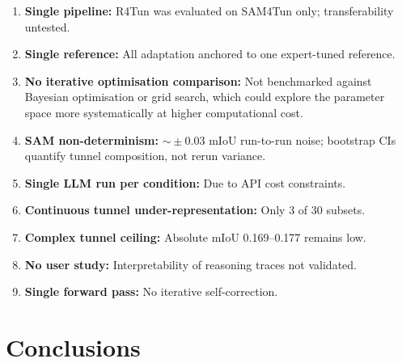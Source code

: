 \documentclass[a4paper,fleqn]{cas-dc}
\begin{document}
\begin{enumerate}
\item \textbf{Single pipeline:} R4Tun was evaluated on SAM4Tun only; transferability untested.
\item \textbf{Single reference:} All adaptation anchored to one expert-tuned reference.
\item \textbf{No iterative optimisation comparison:} Not benchmarked against Bayesian optimisation or grid search, which could explore the parameter space more systematically at higher computational cost.
\item \textbf{SAM non-determinism:} $\sim\!\pm 0.03$ mIoU run-to-run noise; bootstrap CIs quantify tunnel composition, not rerun variance.
\item \textbf{Single LLM run per condition:} Due to API cost constraints.
\item \textbf{Continuous tunnel under-representation:} Only 3 of 30 subsets.
\item \textbf{Complex tunnel ceiling:} Absolute mIoU 0.169--0.177 remains low.
\item \textbf{No user study:} Interpretability of reasoning traces not validated.
\item \textbf{Single forward pass:} No iterative self-correction.
\end{enumerate}


\section{Conclusions}\label{sec:conclusions}
\end{document}
